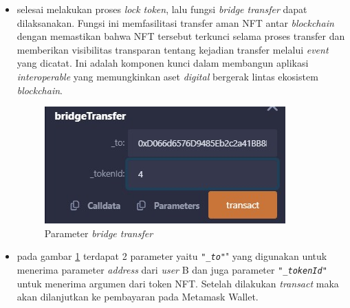 \begin{itemize}
    \item selesai melakukan proses \emph{lock token}, lalu fungsi \emph{bridge transfer} dapat dilaksanakan. Fungsi ini memfasilitasi transfer aman NFT antar \emph{blockchain} dengan memastikan bahwa NFT tersebut terkunci selama proses transfer dan memberikan visibilitas transparan tentang kejadian transfer melalui \emph{event} yang dicatat. Ini adalah komponen kunci dalam membangun aplikasi \emph{interoperable} yang memungkinkan aset \emph{digital} bergerak lintas ekosistem \emph{blockchain}.

    \begin{figure} [H] \centering
    \includegraphics[scale=0.75]{gambar/bridge_transfer.jpeg}
    \caption{Parameter \emph{bridge transfer}}
    \label{fig:bridge_tranfer}
    \end{figure}

    \item pada gambar \ref{fig:bridge_tranfer} terdapat 2 parameter yaitu \texttt{"\emph{\_to}"}" yang digunakan untuk menerima parameter \emph{address} dari \emph{user} B dan juga parameter \texttt{"\emph{\_tokenId}"} untuk menerima argumen dari token NFT. Setelah dilakukan \emph{transact} maka akan dilanjutkan ke pembayaran pada Metamask Wallet.


\end{itemize}

